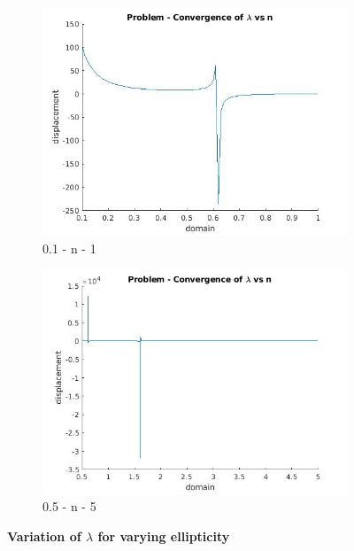 \documentclass[idxtotoc,hyperref,openany]{labbook} %
\begin{document}
\begin{figure}[h!]
\begin{subfigure}[h!]{0.4\textwidth}
		\includegraphics[width=\textwidth]{setFour.jpg}
		\caption{0.1 - n - 1}
		\label{fig:setFour.jpg}
	\end{subfigure}
	\begin{subfigure}[h!]{0.4\textwidth}
		\includegraphics[width=\textwidth]{setSeven.jpg}
		\caption{0.5 - n - 5}
		\label{fig:setSeven.jpg}
	\end{subfigure}
	\caption\Large\textbf{Variation of $\lambda$ for varying ellipticity}
\end{figure}
\end{document}
